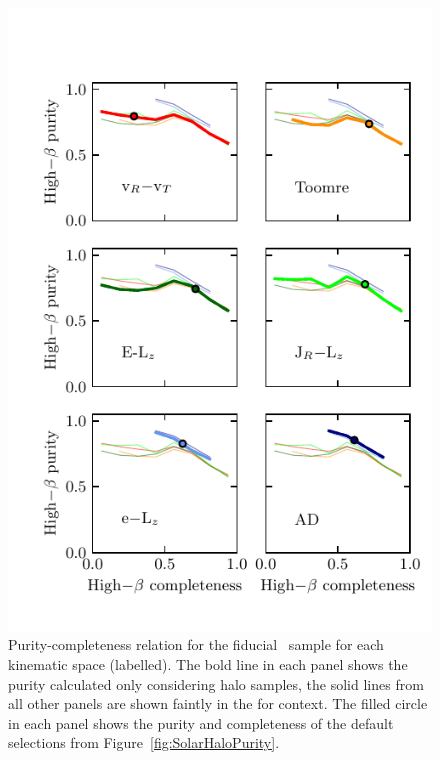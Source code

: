 \begin{figure}
    \centering
    \includegraphics[width=\halftextwidth]{figure/ch2/SolarHaloCompletenessPurity.pdf}
    \caption{Purity-completeness relation for the fiducial \solar\ sample for each kinematic space (labelled). The bold line in each panel shows the purity calculated only considering halo samples, the solid lines from all other panels are shown faintly in the for context. The filled circle in each panel shows the purity and completeness of the default selections from Figure~\ref{fig:SolarHaloPurity}.}
    \label{fig:SolarCPDiagram}
\end{figure}

